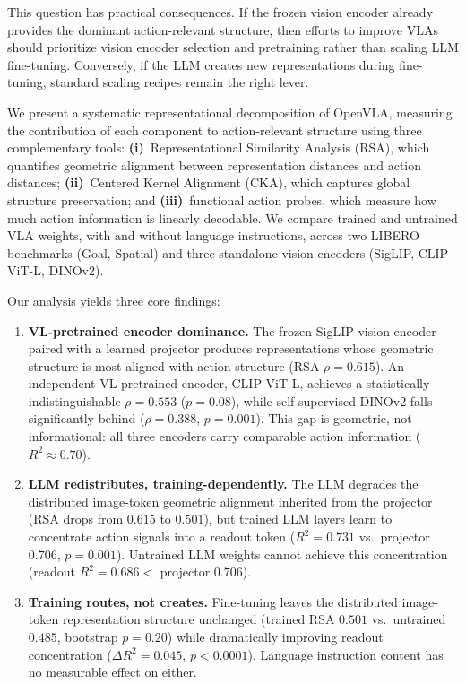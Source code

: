 \documentclass[letterpaper]{article}
\begin{document}
This question has practical consequences.
If the frozen vision encoder already provides the dominant action-relevant structure, then efforts to improve VLAs should prioritize vision encoder selection and pretraining rather than scaling LLM fine-tuning.
Conversely, if the LLM creates new representations during fine-tuning, standard scaling recipes remain the right lever.

We present a systematic representational decomposition of OpenVLA, measuring the contribution of each component to action-relevant structure using three complementary tools: \textbf{(i)}~Representational Similarity Analysis (RSA), which quantifies geometric alignment between representation distances and action distances; \textbf{(ii)}~Centered Kernel Alignment (CKA), which captures global structure preservation; and \textbf{(iii)}~functional action probes, which measure how much action information is linearly decodable.
We compare trained and untrained VLA weights, with and without language instructions, across two LIBERO benchmarks (Goal, Spatial) and three standalone vision encoders (SigLIP, CLIP ViT-L, DINOv2).

Our analysis yields three core findings:
\begin{enumerate}
    \item \textbf{VL-pretrained encoder dominance.} The frozen SigLIP vision encoder paired with a learned projector produces representations whose geometric structure is most aligned with action structure (RSA $\rho{=}0.615$). An independent VL-pretrained encoder, CLIP ViT-L, achieves a statistically indistinguishable $\rho{=}0.553$ ($p{=}0.08$), while self-supervised DINOv2 falls significantly behind ($\rho{=}0.388$, $p{=}0.001$). This gap is geometric, not informational: all three encoders carry comparable action information ($R^2{\approx}0.70$).
    \item \textbf{LLM redistributes, training-dependently.} The LLM degrades the distributed image-token geometric alignment inherited from the projector (RSA drops from $0.615$ to $0.501$), but trained LLM layers learn to concentrate action signals into a readout token ($R^2{=}0.731$ vs.\ projector $0.706$, $p{=}0.001$). Untrained LLM weights cannot achieve this concentration (readout $R^2{=}0.686 < $ projector $0.706$).
    \item \textbf{Training routes, not creates.} Fine-tuning leaves the distributed image-token representation structure unchanged (trained RSA $0.501$ vs.\ untrained $0.485$, bootstrap $p{=}0.20$) while dramatically improving readout concentration ($\Delta R^2{=}0.045$, $p{<}0.0001$). Language instruction content has no measurable effect on either.
\end{enumerate}
\end{document}
